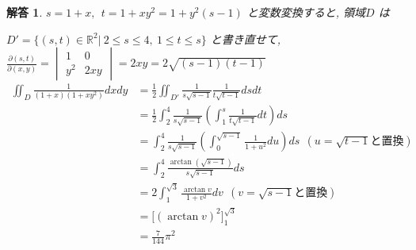 \documentclass{jsarticle}
\newtheorem{answer}{解答}
\begin{document}
\begin{answer}
  $s = 1+x, \ \ t = 1+xy^2 = 1 + y^2(s-1)$ と変数変換すると, 領域$D$ は 
  
$D' = \{(s,t) \in \mathbb{R}^2 | \ 2 \le s \le 4, \ 1 \le t \le s \}$ と書き直せて, $\displaystyle \frac{\partial(s,t)}{\partial(x,y)} = \begin{vmatrix} 1 & 0 \\ y^2 & 2xy \end{vmatrix} = 2xy = 2\sqrt{(s-1)(t-1)}$
\begin{align*}
\displaystyle \iint_D \frac{1}{(1+x)(1+xy^2)} dx dy
&= \displaystyle \frac{1}{2} \iint_{D'} \frac{1}{s\sqrt{s-1}} \frac{1}{t\sqrt{t-1}} ds dt \\
&= \displaystyle \frac{1}{2} \int_2^4 \frac{1}{s\sqrt{s-1}} \left(\displaystyle \int_1^s \frac{1}{t\sqrt{t-1}} dt \right) ds \\
&= \displaystyle \int_2^4 \frac{1}{s\sqrt{s-1}} \left(\displaystyle \int_0^{\sqrt{s-1}} \frac{1}{1+u^2} du \right) ds \ \ (u = \sqrt{t-1} と置換) \\
&= \displaystyle \int_2^4 \frac{\arctan (\sqrt{s-1})}{s\sqrt{s-1}} ds \\
&= 2\displaystyle \int_1^{\sqrt{3}} \frac{\arctan v}{1+v^2} dv \ \ 
  (v = \sqrt{s-1} と置換) \\
&= \Big[(\arctan v)^2 \Big]_1^{\sqrt{3}} \\
&= \displaystyle \frac{7}{144} {\pi}^2 
\end{align*}
 
\end{answer}
\end{document}
